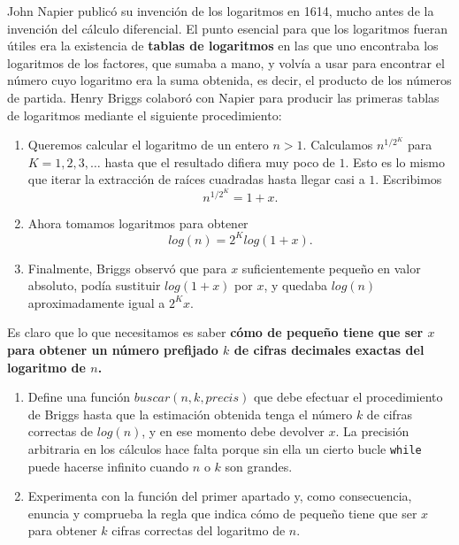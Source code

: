  	\begin{ejer}
 	
 	John Napier publicó su invención de los logaritmos en 1614, mucho antes de la invención del cálculo diferencial. El punto esencial para que los logaritmos fueran útiles era la existencia de {\bf tablas de logaritmos} en las que uno encontraba los logaritmos de los factores, que sumaba a mano, y volvía a usar para encontrar el número cuyo logaritmo era la suma obtenida, es decir,  el producto de los números de partida. 
 	Henry Briggs colaboró con Napier para producir las primeras tablas de logaritmos mediante el siguiente procedimiento:
 	
 	\begin{enumerate}
 	\item Queremos calcular el logaritmo de un entero $n>1$. Calculamos $n^{1/2^K}$ para $K=1,2,3,\dots$ hasta que el resultado difiera muy poco de $1$. Esto es lo mismo que iterar la extracción de raíces cuadradas hasta llegar casi a $1$. Escribimos 
 	$$n^{1/2^K}=1+x.$$
 	
 	\item  Ahora tomamos logaritmos para obtener 
 	$$log(n)=2^Klog(1+x).$$
 	
 	\item  Finalmente, Briggs observó que para $x$ suficientemente pequeño en valor absoluto, podía sustituir $log(1+x)$ por $x$, y quedaba $log(n)$ aproximadamente igual a  $2^Kx.$ 
 	\end{enumerate}
 	Es claro que lo que necesitamos es saber {\bf cómo de pequeño tiene que ser $x$ para obtener un número prefijado $k$ de cifras decimales exactas del logaritmo de $n$.}
 	\begin{enumerate}
 	\item  Define una función $buscar(n,k,precis)$ que debe efectuar el procedimiento de Briggs hasta que la estimación obtenida tenga el número $k$ de cifras correctas de $log(n)$, y en ese momento debe devolver $x$. La precisión arbitraria en los cálculos hace falta porque sin ella un cierto bucle \lstinline|while| puede hacerse infinito cuando $n$ o $k$ son grandes. 
 	
 	\item  Experimenta con la función del primer apartado y, como consecuencia,  enuncia y comprueba la regla que indica cómo de pequeño tiene que ser $x$ para obtener $k$ cifras correctas del logaritmo de $n$.	
 		\end{enumerate}
 		
 		
 		\end{ejer}
 		
 		
 	